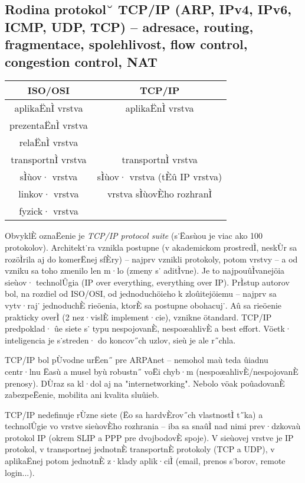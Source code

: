\subsection{Rodina protokol˘ TCP/IP (ARP, IPv4, IPv6, ICMP, UDP, TCP) -- adresace, routing, fragmentace, spolehlivost, flow control, congestion control, NAT}
\begin{center}
\begin{tabular}{|c|c|}
	\hline
	ISO/OSI & TCP/IP \\
	\hline
	\hline
	aplikaËnÌ vrstva & aplikaËnÌ vrstva\\
	prezentaËnÌ vrstva &\\
	relaËnÌ vrstva &\\
	\hline
	transportnÌ vrstva & transportnÌ vrstva \\
	\hline
	sÌùov· vrstva & sÌùov· vrstva (tÈû IP vrstva) \\
	\hline
	linkov· vrstva & vrstva sÌùovÈho rozhranÌ\\
	fyzick· vrstva & \\
	\hline
\end{tabular}
\end{center}

ObvyklÈ oznaËenie je \emph{TCP/IP protocol suite} (s˙Ëasùou je viac ako 100 protokolov). Architekt˙ra vznikla postupne (v akademickom prostredÌ, neskÙr sa rozöÌrila aj do komerËnej sfÈry) -- najprv vznikli protokoly, potom vrstvy -- a od vzniku sa toho zmenilo len m·lo (zmeny s˙ aditÌvne). Je to najpouûÌvanejöia sieùov· technolÛgia (IP over everything, everything over IP). PrÌstup autorov bol, na rozdiel od ISO/OSI, od jednoduchöieho k zloûitejöiemu -- najprv sa vytv·raj˙ jednoduchÈ rieöenia, ktorÈ sa postupne obohacuj˙. Aû sa rieöenie prakticky overÌ (2 nez·vislÈ implement·cie), vznikne ötandard. TCP/IP predpoklad· ûe siete s˙ typu nespojovanÈ, nespoæahlivÈ a best effort. Vöetk· inteligencia je s˙streden· do koncov˝ch uzlov, sieù je  ale r˝chla.

TCP/IP bol pÙvodne urËen˝ pre ARPAnet -- nemohol maù teda ûiadnu centr·lnu Ëasù a musel byù robustn˝ voËi chyb·m (nespoæahlivÈ/nespojovanÈ prenosy). DÙraz sa kl·dol aj na "internetworking". Nebolo vöak poûadovanÈ zabezpeËenie, mobilita ani kvalita sluûieb.

TCP/IP nedefinuje rÙzne siete (Ëo sa hardvÈrov˝ch vlastnostÌ t˝ka) a technolÛgie vo vrstve sieùovÈho rozhrania -- iba sa snaûÌ nad nimi prev·dzkovaù protokol IP (okrem SLIP a PPP pre dvojbodovÈ spoje). V sieùovej vrstve je IP protokol, v transportnej jednotnÈ transportnÈ protokoly (TCP a UDP), v aplikaËnej potom jednotnÈ z·klady aplik·ciÌ (email, prenos s˙borov, remote login...).

